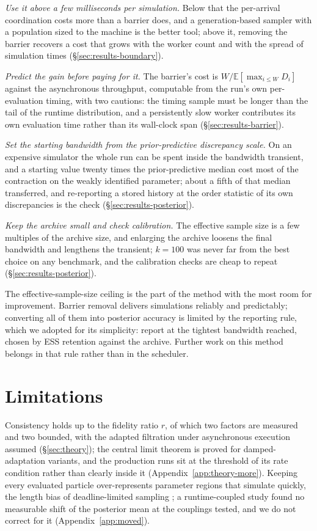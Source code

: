 \documentclass[10pt]{article}
\theoremstyle{plain}
\theoremstyle{definition}
\begin{document}
\emph{Use it above a few milliseconds per simulation.} Below that the per-arrival coordination costs more than a barrier does, and a generation-based sampler with a population sized to the machine is the better tool; above it, removing the barrier recovers a cost that grows with the worker count and with the spread of simulation times (\S\ref{sec:results-boundary}).

\emph{Predict the gain before paying for it.} The barrier's cost is $W/\mathbb{E}[\max_{i\le W}D_i]$ against the asynchronous throughput, computable from the run's own per-evaluation timing, with two cautions: the timing sample must be longer than the tail of the runtime distribution, and a persistently slow worker contributes its own evaluation time rather than its wall-clock span (\S\ref{sec:results-barrier}).

\emph{Set the starting bandwidth from the prior-predictive discrepancy scale.} On an expensive simulator the whole run can be spent inside the bandwidth transient, and a starting value twenty times the prior-predictive median cost most of the contraction on the weakly identified parameter; about a fifth of that median transferred, and re-reporting a stored history at the order statistic of its own discrepancies is the check (\S\ref{sec:results-posterior}).

\emph{Keep the archive small and check calibration.} The effective sample size is a few multiples of the archive size, and enlarging the archive loosens the final bandwidth and lengthens the transient; $k=100$ was never far from the best choice on any benchmark, and the calibration checks are cheap to repeat (\S\ref{sec:results-posterior}).

The effective-sample-size ceiling is the part of the method with the most room for improvement. Barrier removal delivers simulations reliably and predictably; converting all of them into posterior accuracy is limited by the reporting rule, which we adopted for its simplicity: report at the tightest bandwidth reached, chosen by ESS retention against the archive. Further work on this method belongs in that rule rather than in the scheduler.

\section{Limitations}\label{sec:limitations}
Consistency holds up to the fidelity ratio $r$, of which two factors are measured and two bounded, with the adapted filtration under asynchronous execution assumed (\S\ref{sec:theory}); the central limit theorem is proved for damped-adaptation variants, and the production runs sit at the threshold of its rate condition rather than clearly inside it (Appendix~\ref{app:theory-more}). Keeping every evaluated particle over-represents parameter regions that simulate quickly, the length bias of deadline-limited sampling \citep{murray2021anytime}; a runtime-coupled study found no measurable shift of the posterior mean at the couplings tested, and we do not correct for it (Appendix~\ref{app:moved}).
\end{document}
